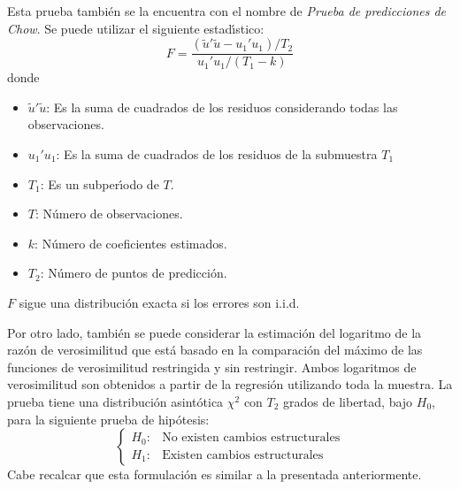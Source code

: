 \begin{observacion}
Esta prueba tambi\'{e}n se la encuentra con el nombre de \emph{Prueba de predicciones de Chow}. Se puede utilizar el 
siguiente estad\'{\i}stico:
\[
F=\frac{\left( \tilde{u}'\tilde{u}-u_{1}'u_{1} 
\right)/T_{2}}{u_{1}'u_{1}/(T_{1}-k)}
\]
donde
\begin{itemize}
\item $\tilde{u}'\tilde{u}$: Es la suma de cuadrados de los residuos considerando 
todas las observaciones.
\item $u_{1}'u_{1}$: Es la suma de cuadrados de los residuos de la submuestra 
$T_{1}$
\item $T_{1}$: Es un subper\'{\i}odo de $T$.
\item $T$: N\'{u}mero de observaciones.
\item $k$: N\'{u}mero de coeficientes estimados.
\item $T_{2}$: N\'{u}mero de puntos de predicci\'{o}n.
\end{itemize}

$F$ sigue una distribuci\'{o}n exacta si los errores son i.i.d.

Por otro lado, tambi\'{e}n se puede considerar la estimaci\'{o}n del 
logaritmo de la raz\'{o}n de verosimilitud que est\'{a} basado en la 
comparaci\'{o}n del m\'{a}ximo de las funciones de verosimilitud restringida 
y sin restringir. Ambos logaritmos de verosimilitud son obtenidos a partir 
de la regresi\'{o}n utilizando toda la muestra. La prueba tiene una 
distribuci\'{o}n asint\'{o}tica $\chi^{2}$ con $T_{2}$ grados de libertad, 
bajo $H_{0}$, para la siguiente prueba de hip\'{o}tesis:
\[
\begin{cases}
 H_{0}:&\text{No  existen  cambios  estructurales}\\
 H_{1}:&\text{Existen  cambios  estructurales}
\end{cases}
\]
Cabe recalcar que esta formulaci\'{o}n es similar a la presentada 
anteriormente.
\end{observacion}


